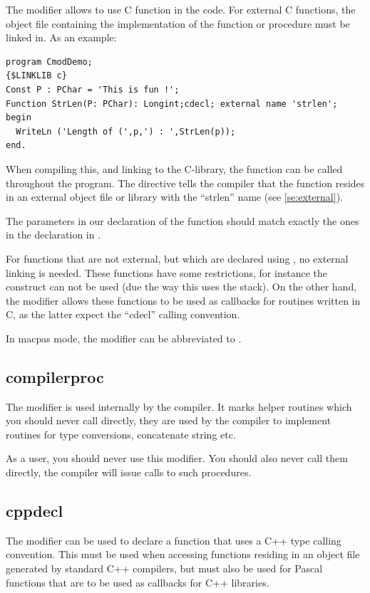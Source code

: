 The  modifier allows to use C function in the code.
For external C functions, the object file containing the 
implementation of the function or procedure must be linked in.
As an example:
\begin{verbatim}
program CmodDemo;
{$LINKLIB c}
Const P : PChar = 'This is fun !';
Function StrLen(P: PChar): Longint;cdecl; external name 'strlen';
begin
  WriteLn ('Length of (',p,') : ',StrLen(p));
end.
\end{verbatim}
When compiling this, and linking to the C-library, the  function
can be called throughout the program. The  directive tells
the compiler that the function resides in an external object file or library
with the ``strlen'' name (see \ref{se:external}).
\begin{remark}
The parameters in our declaration of the  function should
match exactly the ones in the declaration in .
\end{remark}

For functions that are not external, but which are declared using
, no external linking is needed. These functions have some
restrictions, for instance the  construct can not be
used (due the way this uses the stack). On the other hand, the
 modifier allows these functions to be used as callbacks for
routines written in C, as the latter expect the ``cdecl'' calling convention.

\begin{remark}
In macpas mode, the  modifier can be abbreviated to .
\end{remark}  

\subsection{compilerproc}
\label{se:compilerproc}
The  modifier is used internally by the compiler. It marks
helper routines which you should never call directly, they are used by the
compiler to implement routines for type conversions, concatenate string etc.

As a user, you should never use this modifier. You should also never call
them directly, the compiler will issue calls to such procedures.

\subsection{cppdecl}
\label{se:cppdecl}
The  modifier can be used to declare a function that uses a C++
type calling convention. This must be used when accessing functions residing in
an object file generated by standard C++ compilers, but must also be used for
Pascal functions that are to be used as callbacks for C++ libraries.

